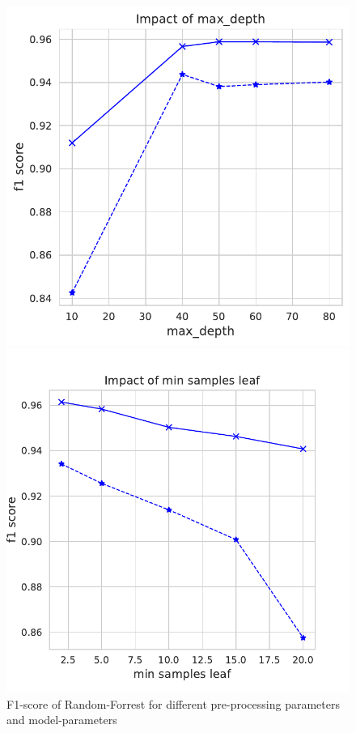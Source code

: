 \documentclass[11pt]{article}
\begin{document}
\begin{figure}
\begin{minipage}[l]{0.3\textwidth}
\end{minipage}
\begin{minipage}[l]{0.3\textwidth}
\includegraphics[width=1\linewidth]{email_spam/rnd_depth.pdf}
\end{minipage}
\begin{minipage}[l]{0.3\textwidth}
\includegraphics[width=1\linewidth]{email_spam/rnd_min_samples_leaf.pdf}
\end{minipage}
   \caption{F1-score of Random-Forrest for different pre-processing parameters and model-parameters}
\label{spamfig_fig2}
\end{figure}
\end{document}
